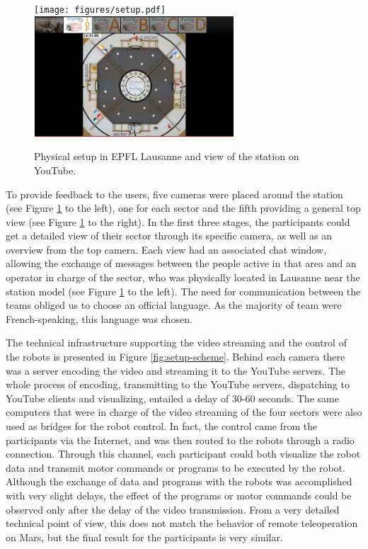 \documentclass{intech-journal}
\begin{document}
\begin{figure}[ht]
 \centering
    \texttt{[image: figures/setup.pdf]}
    \includegraphics[height=45mm]{figures/youtube-view.png}
  \caption{Physical setup in EPFL Lausanne and view of the station on YouTube.}
  \label{fig:setup-physical} 
\end{figure}

To provide feedback to the users, five cameras were placed around the station (see Figure \ref{fig:setup-physical} to the left), one for each sector and the fifth providing a general top view (see Figure \ref{fig:setup-physical} to the right).
In the first three stages, the participants could get a detailed view of their sector through its specific camera, as well as an overview from the top camera.
Each view had an associated chat window, allowing the exchange of messages between the people active in that area and an operator in charge of the sector, who was physically located in Lausanne near the station model (see Figure \ref{fig:setup-physical} to the left).
The need for communication between the teams obliged us to choose an official language. 
As the majority of team were French-speaking, this language was chosen.

The technical infrastructure supporting the video streaming and the control of the robots is presented in Figure \ref{fig:setup-scheme}.
Behind each camera there was a server encoding the video and streaming it to the YouTube servers. 
The whole process of encoding, transmitting to the YouTube servers, dispatching to YouTube clients and visualizing, entailed a delay of 30-60 seconds.
The same computers that were in charge of the video streaming of the four sectors were also used as bridges for the robot control. 
In fact, the control came from the participants via the Internet, and was then routed to the robots through a radio connection. 
Through this channel, each participant could both visualize the robot data and transmit motor commands or programs to be executed by the robot. 
Although the exchange of data and programs with the robots was accomplished with very slight delays, the effect of the programs or motor commands could be observed only after the delay of the video transmission. 
From a very detailed technical point of view, this does not match the behavior of remote teleoperation on Mars, but the final result for the participants is very similar.
\end{document}
